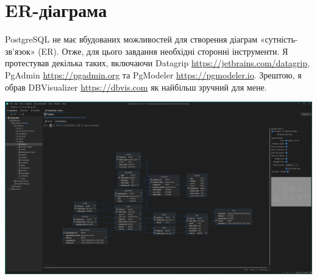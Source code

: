 \section{ER-діаграма}

PostgreSQL не має вбудованих можливостей для створення діаграм «сутність-зв'язок» (ER).
Отже, для цього завдання необхідні сторонні інструменти.
Я протестував декілька таких, включаючи Datagrip \url{https://jetbrains.com/datagrip},
PgAdmin \url{https://pgadmin.org} та PgModeler \url{https://pgmodeler.io}.
Зрештою, я обрав DBVisualizer \url{https://dbvis.com} як найбільш зручний для мене.

\includegraphics[width=1\linewidth]{../assets/image_2024-12-07_05-56-39.png}
